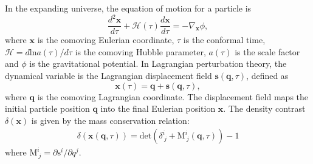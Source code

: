 \documentclass[aps,prd,twocolumn,showpacs,superscriptaddress,groupedaddress,nofootinbib]{revtex4}  %
\newcommand{\mr}{\mathrm}
\newcommand{\mb}{\mathbf}
\begin{document}

In the expanding universe, the equation of motion for a particle is 
\begin{equation}
\label{eq1}
\frac{d^2{\bm x}}{d\tau}+\mathcal{H}(\tau)\frac{d{\bm x}}{d\tau}
=-\nabla_{\bm x}\phi,
\end{equation}
where $\bm{x}$ is the comoving Eulerian coordinate, $\tau$ is the conformal 
time, $\mathcal{H}=d\mr{ln}a(\tau)/d\tau$ is the comoving Hubble parameter, 
$a(\tau)$ is the scale factor and $\phi$ is the gravitational potential.
In Lagrangian perturbation theory, the dynamical variable is the Lagrangian 
displacement field $\mathbf{s}(\bm{q},\tau)$, defined as
\begin{equation}
\label{eq2}
\bm{x}(\tau)=\bm{q}+\mb{s}(\bm{q},\tau),
\end{equation}
where $\bm{q}$ is the comoving Lagrangian coordinate. The displacement field
maps the initial particle position $\bm{q}$ into the final Eulerian position
$\bm{x}$.
The density contrast $\delta(\bm{x})$ is given by the mass conservation relation:
\begin{eqnarray}
\label{eq3}
\delta(\bm{x}(\bm{q},\tau))=\mr{det}(\delta^i_{\ j}+\mr{M}^i_{\ j}
(\bm{q},\tau))-1
\end{eqnarray}
where $\mr{M}^i_{\ j}=\partial\mr{s}^i/\partial q^j$.
\end{document}
